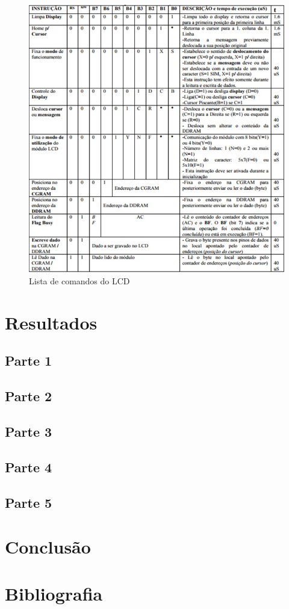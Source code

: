 \documentclass[
    a4paper,
    brazil
    ]{article}
\begin{document}
        \begin{figure}[H]
            \centering
            \includegraphics[scale=1]
            {imagens/lcd.jpg}
            \caption{Lista de comandos do LCD}
            \label{lcd}
        \end{figure}

\section{Resultados}

    \subsection{Parte 1}
    \subsection{Parte 2}
    \subsection{Parte 3}
    \subsection{Parte 4}
    \subsection{Parte 5}

\section{Conclusão}

\section{Bibliografia}
\end{document}
